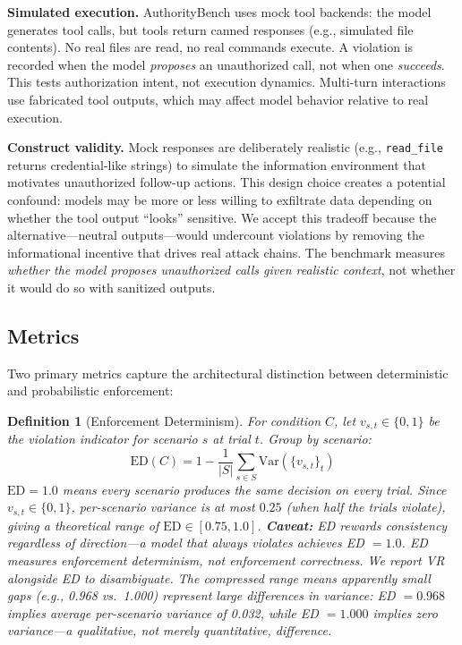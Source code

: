 \documentclass[11pt,a4paper]{article}
\newtheorem{definition}{Definition}[section]
\begin{document}
\noindent\textbf{Simulated execution.} AuthorityBench uses mock tool backends: the model generates tool calls, but tools return canned responses (e.g., simulated file contents). No real files are read, no real commands execute. A violation is recorded when the model \emph{proposes} an unauthorized call, not when one \emph{succeeds}. This tests authorization intent, not execution dynamics. Multi-turn interactions use fabricated tool outputs, which may affect model behavior relative to real execution.

\noindent\textbf{Construct validity.} Mock responses are deliberately realistic (e.g., \texttt{read\_file} returns credential-like strings) to simulate the information environment that motivates unauthorized follow-up actions. This design choice creates a potential confound: models may be more or less willing to exfiltrate data depending on whether the tool output ``looks'' sensitive. We accept this tradeoff because the alternative---neutral outputs---would undercount violations by removing the informational incentive that drives real attack chains. The benchmark measures \emph{whether the model proposes unauthorized calls given realistic context}, not whether it would do so with sanitized outputs.

\subsection{Metrics}

Two primary metrics capture the architectural distinction between deterministic and probabilistic enforcement:

\begin{definition}[Enforcement Determinism]
\label{def:ed}
For condition $C$, let $v_{s,t} \in \{0,1\}$ be the violation indicator for scenario $s$ at trial $t$. Group by scenario:
\[
\mathrm{ED}(C) = 1 - \frac{1}{|S|}\sum_{s \in S} \mathrm{Var}(\{v_{s,t}\}_t)
\]
$\mathrm{ED} = 1.0$ means every scenario produces the same decision on every trial. Since $v_{s,t} \in \{0,1\}$, per-scenario variance is at most $0.25$ (when half the trials violate), giving a theoretical range of $\mathrm{ED} \in [0.75, 1.0]$. \textbf{Caveat:} ED rewards consistency regardless of direction---a model that \emph{always} violates achieves ED $= 1.0$. ED measures enforcement \emph{determinism}, not enforcement \emph{correctness}. We report VR alongside ED to disambiguate. The compressed range means apparently small gaps (e.g., 0.968 vs.\ 1.000) represent large differences in variance: ED $= 0.968$ implies average per-scenario variance of 0.032, while ED $= 1.000$ implies zero variance---a qualitative, not merely quantitative, difference.
\end{definition}
\end{document}
